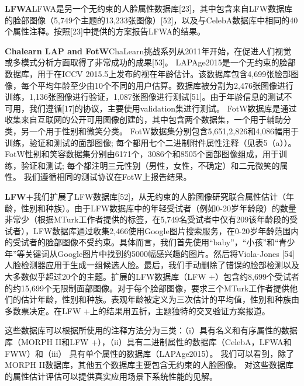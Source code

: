 \textbf{LFWA}LFWA是另一个无约束的人脸属性数据库[23]，其中包含来自LFW数据库的脸部图像（5,749个主题的13,233张图像）[52]，以及与CelebA数据库中相同的40个属性注释。按照[23]中提供的方案报告LFWA的结果。

\textbf{Chalearn LAP and FotW}ChaLearn挑战系列从2011年开始，在促进人们视觉或多模式分析方面取得了非常成功的成果[53]。 
LAPAge2015是一个无约束的脸部数据库，用于在ICCV 2015.5上发布的视在年龄估计。该数据库包含4,699张脸部图像，每个平均年龄至少由10个不同的用户估算。数据库被分割为2,476张图像进行训练，1,136张图像进行验证，1,087张图像进行测试[51]。由于年龄信息的测试不可用，我们遵循[17]的协议，主要使用validation集进行测试。 FotW数据库是通过收集来自互联网的公开可用图像创建的，其中包含两个数据集，一个用于辅助分类，另一个用于性别和微笑分类。 FotW数据集分别包含5,651,2,826和4,086幅用于训练，验证和测试的面部图像; 每个都用七个二进制附件属性注释（见表5（a））。 FotW性别和笑容数据集分别由6171个，3086个和8505个面部图像组成，用于训练，验证和测试; 每个都注明三元性别（男性，女性，不确定）和二元微笑的属性。 我们遵循相同的测试协议在FotW上报告结果。

\textbf{LFW+}我们扩展了LFW数据库[52]，从无约束的人脸图像研究联合属性估计（年龄，性别和种族）。由于LFW数据库中的年轻受试者（例如0-20岁年龄段）的数量非常少（根据MTurk工作者提供的标签，在5,749名受试者中仅有209该年龄段的受试者），LFW数据库通过收集2,466使用Google图片搜索服务，在0-20岁年龄范围内的受试者的脸部图像不受约束。具体而言，我们首先使用“baby”，“小孩”和“青少年”等关键词从Google图片中找到约5000幅感兴趣的图片。然后将Viola-Jones [54]人脸检测器应用于生成一组候选人脸。最后，我们手动删除了错误的脸部检测以及大多数似乎超过20个的主题。扩展的LFW数据库（LFW +）包含约8,699个受试者的约15,699个无限制面部图像。对于每个脸部图像，要求三个MTurk工作者提供他们的估计年龄，性别和种族。表观年龄被定义为三次估计的平均值，性别和种族由多数票决定。在LFW +上的结果用五折，主题独特的交叉验证方案报道。

这些数据库可以根据所使用的注释方法分为三类：（i）具有名义和有序属性的数据库（MORPH II和LFW +），（ii）具有二进制属性的数据库（CelebA，LFWA和FWW）和（iii） 具有单个属性的数据库（LAPAge2015）。 我们可以看到，除了MORPH II数据库，其他五个数据库主要包含无约束的人脸图像。 对这些数据库的属性估计评估可以提供真实应用场景下系统性能的见解。 


